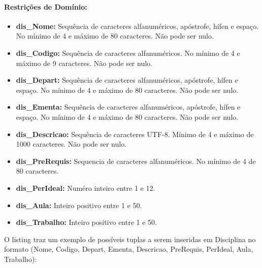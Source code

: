 \documentclass{report}
\begin{document}
\paragraph{Restrições de Domínio:}
\begin{itemize}
  \item \textbf{dis\_Nome:} Sequência de caracteres alfanuméricos, apóstrofe, hífen e espaço. No mínimo de 4 e máximo de 80 caracteres. Não pode ser nulo.
  \item \textbf{dis\_Codigo:}  Sequência de caracteres alfanuméricos. No mínimo de 4 e máximo de 9 caracteres. Não pode ser nulo.
  \item \textbf{dis\_Depart:} Sequência de caracteres alfanuméricos, apóstrofe, hífen e espaço. No mínimo de 4 e máximo de 80 caracteres. Não pode ser nulo.
  \item \textbf{dis\_Ementa:} Sequência de caracteres alfanuméricos, apóstrofe, hífen e espaço. No mínimo de 4 e máximo de 80 caracteres. Não pode ser nulo.
  \item \textbf{dis\_Descricao:} Sequência de caracteres UTF-8. Mínimo de 4 e máximo de 1000 caracteres. Não pode ser nulo.
  \item \textbf{dis\_PreRequis:} Sequencia de caracteres alfanuméricos. No mínimo de 4 de 80 caracteres. 
  \item \textbf{dis\_PerIdeal:}  Numéro inteiro entre 1 e 12.
  \item \textbf{dis\_Aula:} Inteiro positivo entre 1 e 50.
  \item \textbf{dis\_Trabalho:} Inteiro positivo entre 1 e 50.
\end{itemize}

O listing traz um exemplo de possíveis tuplas a serem inseridas em Disciplina no formato (Nome, Codigo, Depart, Ementa, Descricao, PreRequis, PerIdeal, Aula, Trabalho):
\end{document}
